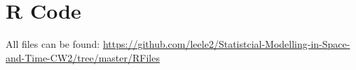 \appendix
\gdef\thesection{Appendix \Alph{section}:}
\section{R Code}

All files can be found: \small{\url{https://github.com/leele2/Statistcial-Modelling-in-Space-and-Time-CW2/tree/master/RFiles}}









